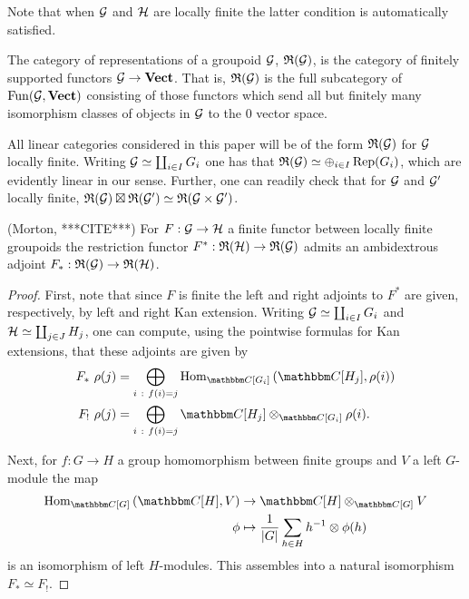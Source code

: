 \begin{Remark}
Note that when $\mathcal{G}$ and $\mathcal{H}$ are locally finite the latter condition is automatically satisfied.
\end{Remark} 

\begin{Definition}
The category of representations of a groupoid $\mathcal{G}$, $\mathfrak{R}(\mathcal{G})$, is the category of finitely supported functors $\mathcal{G} \to \mathbf{Vect}$. That is, $\mathfrak{R}(\mathcal{G})$ is the full subcategory of $\operatorname{Fun}(\mathcal{G},\mathbf{Vect})$ consisting of those functors which send all but finitely many isomorphism classes of objects in $\mathcal{G}$ to the $0$ vector space. 
\end{Definition}

All linear categories considered in this paper will be of the form $\mathfrak{R}(\mathcal{G})$ for $\mathcal{G}$ locally finite. Writing $\mathcal{G} \simeq \coprod_{i \in I} G_i$ one has that $\mathfrak{R}(\mathcal{G}) \simeq \oplus_{i \in I} \operatorname{Rep}(G_i)$, which are evidently linear in our sense. Further, one can readily check that for $\mathcal{G}$ and $\mathcal{G}'$ locally finite, $\mathfrak{R}(\mathcal{G}) \boxtimes \mathfrak{R}(\mathcal{G}') \simeq \mathfrak{R}(\mathcal{G} \times \mathcal{G}')$. 

\begin{Proposition}
(Morton, ***CITE***) For $F: \mathcal{G} \to \mathcal{H}$ a finite functor between locally finite groupoids the restriction functor $F^*: \mathfrak{R}(\mathcal{H}) \to \mathfrak{R}(\mathcal{G})$ admits an ambidextrous adjoint $F_*: \mathfrak{R}(\mathcal{G}) \to \mathfrak{R}(\mathcal{H})$.
\end{Proposition}
\begin{proof}
 First, note that since $F$ is finite the left and right adjoints to $F^*$ are given, respectively, by left and right Kan extension. Writing $\mathcal{G} \simeq \coprod_{i \in I} G_i$ and $\mathcal{H}\simeq \coprod_{j \in J} H_j$, one can compute, using the pointwise formulas for Kan extensions, that these adjoints are given by
\begin{align}
 F_* \ \rho(j) &= \bigoplus_{i \ : \ f(i)=j} \Hom_{\CC[G_i]}\left(\CC[H_j], \rho(i) \right) \nonumber \\
 F_! \ \rho(j) &= \bigoplus_{i \ : \ f(i)=j} \CC[H_j] \otimes_{\CC[G_i]} \rho(i) \nonumber.
\end{align}
 

Next, for $f:G \to H$ a group homomorphism between finite groups and $V$ a left $G$-module the map
 \begin{align}
   \Hom_{\CC[G]}\left(\CC[H], V \right) &\to \CC[H] \otimes_{\CC[G]} V \nonumber \\
  \phi &\mapsto  \frac{1}{|G|} \sum_{h \in H} h^{-1} \otimes \phi(h) \nonumber %
 \end{align}
is an isomorphism of left $H$-modules. This assembles into a natural isomorphism $ F_* \simeq F_!$.

\end{proof}

